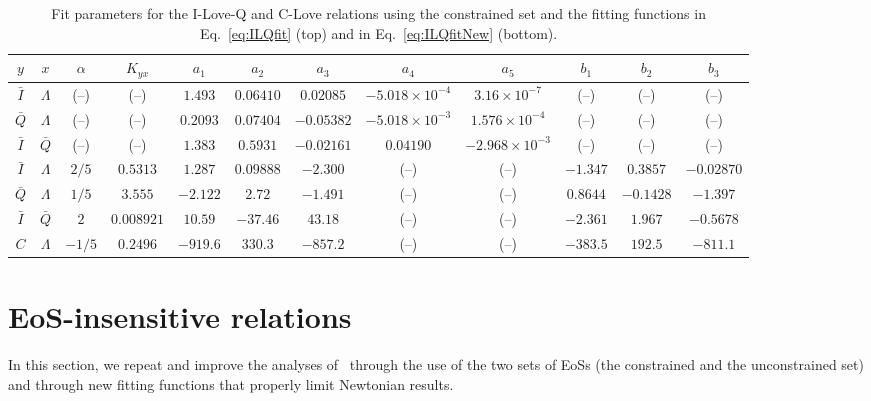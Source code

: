 \documentclass[prd,twocolumn,nofootinbib,superscriptaddress,amsmath,amssymb]{revtex4-1}
\begin{document}

\begin{table}[htb]
\centering
\begin{tabular}{ c  c  | c c c c c c c c c c} 
 \hline
 \hline
 $y$ & $x$ & $\alpha$ & $K_{yx}$ & $a_1$ & $a_2$ & $a_3$ & $a_{4}$ & $a_{5}$ & $b_1$ & $b_2$ & $b_3$ \\
 \hline
  $\bar{I}$ & $\Lambda$ & (--) & (--) & $1.493$ & $0.06410$ & $0.02085$ & $-5.018 \times 10^{-4}$ & $3.16 \times 10^{-7}$ & (--) & (--) & (--)  \\
 $\bar{Q}$ & $\Lambda$ & (--) & (--) & $0.2093$ & $0.07404$ & $-0.05382$ & $-5.018 \times 10^{-3}$ & $1.576 \times 10^{-4}$ & (--)  &(--)  & (--) \\ 
  $\bar{I}$ & $\bar{Q}$ & (--) & (--) & $1.383$ & $0.5931$ & $-0.02161$ & $0.04190$ & $-2.968 \times 10^{-3}$ &(--)  &(--) & (--) \\
 \hline 
 $\bar{I}$ & $\Lambda$ & $2/5$ & $0.5313$ & $1.287$ & $0.09888$ & $-2.300$ & (--) & (--) & $-1.347$ & $0.3857$ & $-0.02870$\\
 $\bar{Q}$ & $\Lambda$ & $1/5$ & $3.555$ & $-2.122$ & $2.72$ & $-1.491$ & (--) & (--) & $0.8644$ & $-0.1428$ & $-1.397$\\
 $\bar{I}$ & $\bar{Q}$ & $2$ & $0.008921$ & $10.59$ & $-37.46$ & $43.18$ &(--)  &(--)  & $-2.361$ & $1.967$ & $-0.5678$\\
 $C$ & $\Lambda$ & $-1/5$ & $0.2496$ & $-919.6$ & $330.3$ & $-857.2$ & (--) & (--) & $-383.5$ & $192.5$ & $-811.1$\\
\hline
\hline
\end{tabular}
\caption{
Fit parameters for the I-Love-Q and C-Love relations using the constrained set and the fitting functions in Eq.~\eqref{eq:ILQfit} (top) and in Eq.~\eqref{eq:ILQfitNew} (bottom).
}\label{tab:ILQfitNew}
\end{table}

\section{EoS-insensitive relations}
\label{sec:universal}

In this section, we repeat and improve the analyses of~\cite{Yagi:binLove,Yagi:ILQ} through the use of the two sets of EoSs (the constrained and the unconstrained set) and through new fitting functions that properly limit Newtonian results.   
\end{document}
